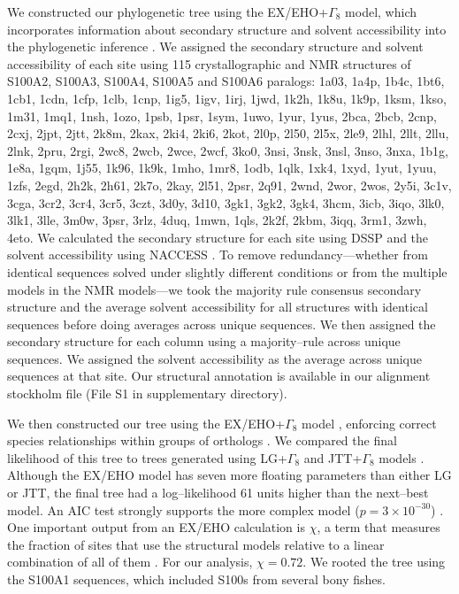 We constructed our phylogenetic tree using the EX/EHO+$\Gamma_{8}$
model, which incorporates information about secondary structure and
solvent accessibility into the phylogenetic inference \citep{le_accounting_2010}.
We assigned the secondary structure and solvent accessibility of each
site using 115 crystallographic and NMR structures of S100A2, S100A3,
S100A4, S100A5 and S100A6 paralogs: 1a03, 1a4p, 1b4c, 1bt6, 1cb1, 1cdn, 1cfp, 1clb, 1cnp, 1ig5, 1igv, 1irj, 1jwd, 1k2h, 1k8u, 1k9p, 1ksm, 1kso, 1m31, 1mq1, 1nsh, 1ozo, 1psb, 1psr, 1sym, 1uwo, 1yur, 1yus, 2bca, 2bcb, 2cnp, 2cxj, 2jpt, 2jtt, 2k8m, 2kax, 2ki4, 2ki6, 2kot, 2l0p, 2l50, 2l5x, 2le9, 2lhl, 2llt, 2llu, 2lnk, 2pru, 2rgi, 2wc8, 2wcb, 2wce, 2wcf, 3ko0, 3nsi, 3nsk, 3nsl, 3nso, 3nxa, 1b1g, 1e8a, 1gqm, 1j55, 1k96, 1k9k, 1mho, 1mr8, 1odb, 1qlk, 1xk4, 1xyd, 1yut, 1yuu, 1zfs, 2egd, 2h2k, 2h61, 2k7o, 2kay, 2l51, 2psr, 2q91, 2wnd, 2wor, 2wos, 2y5i, 3c1v, 3cga, 3cr2, 3cr4, 3cr5, 3czt, 3d0y, 3d10, 3gk1, 3gk2, 3gk4, 3hcm, 3icb, 3iqo, 3lk0, 3lk1, 3lle, 3m0w, 3psr, 3rlz, 4duq, 1mwn, 1qls, 2k2f, 2kbm, 3iqq, 3rm1, 3zwh, 4eto.
We calculated the secondary structure for each site using DSSP and
the solvent accessibility using NACCESS \citep{frishman_knowledge-based_1995,hubbard_naccess_1993}.
To remove redundancy---whether from identical sequences solved under
slightly different conditions or from the multiple models in the NMR
models---we took the majority rule consensus secondary structure and
the average solvent accessibility for all structures with identical
sequences before doing averages across unique sequences. We then assigned
the secondary structure for each column using a majority--rule across
unique sequences. We assigned the solvent accessibility as the average
across unique sequences at that site. Our structural annotation is
available in our alignment stockholm file (File S1 in supplementary directory). 

We then constructed our tree using the EX/EHO+$\Gamma_{8}$ model
\citep{le_accounting_2010}, enforcing correct species relationships
within groups of orthologs \citep{groussin_toward_2015}. We compared
the final likelihood of this tree to trees generated using LG+$\Gamma_{8}$
and JTT+$\Gamma_{8}$ models \citep{jones_rapid_1992,le_improved_2008}.
Although the EX/EHO model has seven more floating parameters than
either LG or JTT, the final tree had a log--likelihood 61 units higher
than the next--best model. An AIC test strongly supports the more complex
model ($p=3\times10^{-30}$) . One important output from an EX/EHO
calculation is $\chi$, a term that measures the fraction of sites
that use the structural models relative to a linear combination of
all of them \citep{le_accounting_2010}. For our analysis, $\chi=0.72$.
We rooted the tree using the S100A1 sequences, which included S100s
from several bony fishes. 

